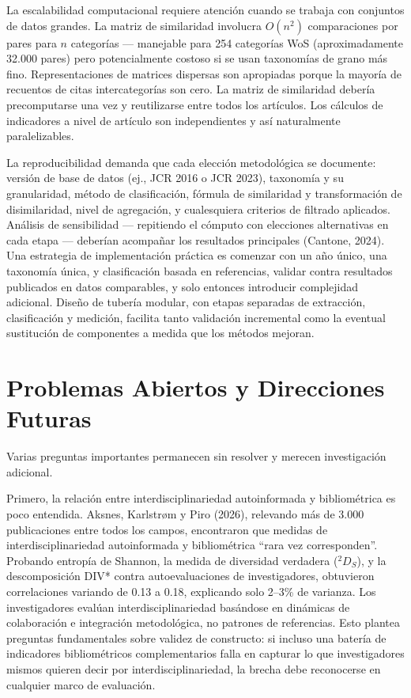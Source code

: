 \documentclass[
]{article}
\begin{document}
La escalabilidad computacional requiere atención cuando se trabaja con
conjuntos de datos grandes. La matriz de similaridad involucra
\(O(n^2)\) comparaciones por pares para \(n\) categorías --- manejable
para 254 categorías WoS (aproximadamente 32.000 pares) pero
potencialmente costoso si se usan taxonomías de grano más fino.
Representaciones de matrices dispersas son apropiadas porque la mayoría
de recuentos de citas intercategorías son cero. La matriz de similaridad
debería precomputarse una vez y reutilizarse entre todos los artículos.
Los cálculos de indicadores a nivel de artículo son independientes y así
naturalmente paralelizables.

La reproducibilidad demanda que cada elección metodológica se documente:
versión de base de datos (ej., JCR 2016 o JCR 2023), taxonomía y su
granularidad, método de clasificación, fórmula de similaridad y
transformación de disimilaridad, nivel de agregación, y cualesquiera
criterios de filtrado aplicados. Análisis de sensibilidad --- repitiendo
el cómputo con elecciones alternativas en cada etapa --- deberían
acompañar los resultados principales (Cantone, 2024). Una estrategia de
implementación práctica es comenzar con un año único, una taxonomía
única, y clasificación basada en referencias, validar contra resultados
publicados en datos comparables, y solo entonces introducir complejidad
adicional. Diseño de tubería modular, con etapas separadas de
extracción, clasificación y medición, facilita tanto validación
incremental como la eventual sustitución de componentes a medida que los
métodos mejoran.

\hypertarget{problemas-abiertos-y-direcciones-futuras}{%
\section{Problemas Abiertos y Direcciones
Futuras}\label{problemas-abiertos-y-direcciones-futuras}}

Varias preguntas importantes permanecen sin resolver y merecen
investigación adicional.

Primero, la relación entre interdisciplinariedad autoinformada y
bibliométrica es poco entendida. Aksnes, Karlstrøm y Piro (2026),
relevando más de 3.000 publicaciones entre todos los campos, encontraron
que medidas de interdisciplinariedad autoinformada y bibliométrica
``rara vez corresponden''. Probando entropía de Shannon, la medida de
diversidad verdadera (\(^2D_S\)), y la descomposición DIV* contra
autoevaluaciones de investigadores, obtuvieron correlaciones variando de
0.13 a 0.18, explicando solo 2--3\% de varianza. Los investigadores
evalúan interdisciplinariedad basándose en dinámicas de colaboración e
integración metodológica, no patrones de referencias. Esto plantea
preguntas fundamentales sobre validez de constructo: si incluso una
batería de indicadores bibliométricos complementarios falla en capturar
lo que investigadores mismos quieren decir por interdisciplinariedad, la
brecha debe reconocerse en cualquier marco de evaluación.
\end{document}
